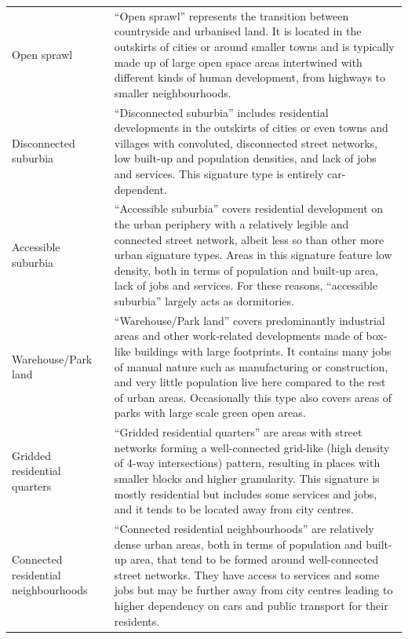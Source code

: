 \documentclass[fleqn,10pt]{wlscirep}
\begin{document}
\begin{longtable}{p{}p{}}
    Open sprawl                          &                                                                                                                           “Open sprawl” represents the transition between countryside and urbanised land. It is located in the outskirts of cities or around smaller towns and is typically made up of large open space areas intertwined with different kinds of human development, from highways to smaller neighbourhoods. \\
    Disconnected suburbia                &                                                                                                                                           “Disconnected suburbia” includes residential developments in the outskirts of cities or even towns and villages with convoluted, disconnected street networks, low built-up and population densities, and lack of jobs and services. This signature type is entirely car-dependent. \\
    Accessible suburbia                  &                                        “Accessible suburbia” covers residential development on the urban periphery with a relatively legible and connected street network, albeit less so than other more urban signature types. Areas in this signature feature low density, both in terms of population and built-up area, lack of jobs and services. For these reasons, “accessible suburbia” largely acts as dormitories. \\
    Warehouse/Park land                  &                                “Warehouse/Park land” covers predominantly industrial areas and other work-related developments made of box-like buildings with large footprints. It contains many jobs of manual nature such as manufacturing or construction, and very little population live here compared to the rest of urban areas. Occasionally this type also covers areas of parks with large scale green open areas. \\
    Gridded residential quarters         &                                                                                  “Gridded residential quarters” are areas with street networks forming a well-connected grid-like (high density of 4-way intersections) pattern, resulting in places with smaller blocks and higher granularity. This signature is mostly residential but includes some services and jobs, and it tends to be located away from city centres. \\
    Connected residential neighbourhoods &                                                                     “Connected residential neighbourhoods” are relatively dense urban areas, both in terms of population and built-up area, that tend to be formed around well-connected street networks. They have access to services and some jobs but may be further away from city centres leading to higher dependency on cars and public transport for their residents. \\

\end{longtable}
\end{document}

